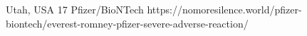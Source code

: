           {Utah, USA}
          {17}
          {Pfizer/BioNTech}
          {}
          {
          }
          {https://nomoresilence.world/pfizer-biontech/everest-romney-pfizer-severe-adverse-reaction/}

